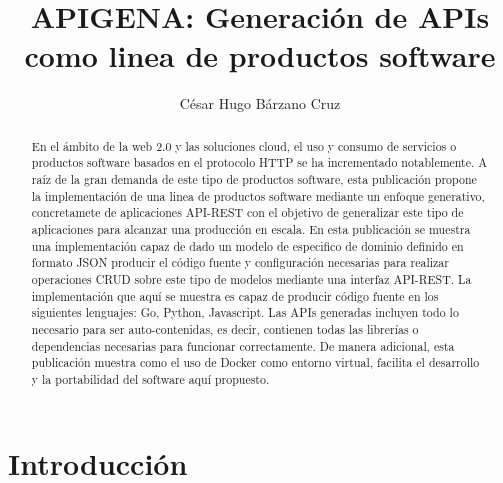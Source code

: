 \documentclass{svproc}
\begin{document}


\mainmatter             


\title{APIGENA: Generación de APIs como linea de productos software}

\author{César Hugo Bárzano Cruz }

\maketitle              %

\begin{abstract}

En el ámbito de la web 2.0 y las soluciones cloud,  el uso y consumo de servicios o productos software basados en el protocolo HTTP se ha incrementado notablemente. A raíz de la gran demanda de este tipo de productos software, esta publicación propone la implementación  de una linea de productos software mediante un enfoque generativo, concretamete  de aplicaciones  API-REST con el objetivo de generalizar este tipo de aplicaciones para alcanzar una producción en escala. En esta publicación se muestra una implementación  capaz de dado un modelo de especifico de dominio definido en formato JSON producir el código fuente y configuración necesarias para realizar operaciones CRUD sobre este tipo de modelos mediante una interfaz API-REST.  La implementación que aquí se muestra es capaz de producir código fuente en los siguientes lenguajes: Go, Python, Javascript. Las APIs generadas incluyen todo lo necesario para ser auto-contenidas, es decir, contienen todas las librerías o dependencias necesarias para funcionar correctamente. De manera adicional, esta publicación muestra como el uso de Docker como entorno virtual,  facilita el desarrollo y la portabilidad del software aquí propuesto.  


\end{abstract}

\section{Introducción}
\end{document}
